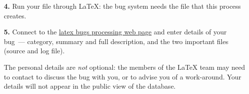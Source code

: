 \nothtml{\noindent}\textbf{4.} Run your file through \LaTeX{}: the bug
system needs the  file that this process creates.

\nothtml{\noindent}\textbf{5.} Connect to the %
\href{http://www.latex-project.org/bugs-upload.html}{latex bugs processing web page}
and enter details of your bug~--- category, summary and full
description, and the two important files (source and log file).

The personal details are \emph{not} optional: the members of the
\LaTeX{} team may need to contact to discuss the bug with you, or to
advise you of a work-around.  Your details will not appear in the
public view of the database.

